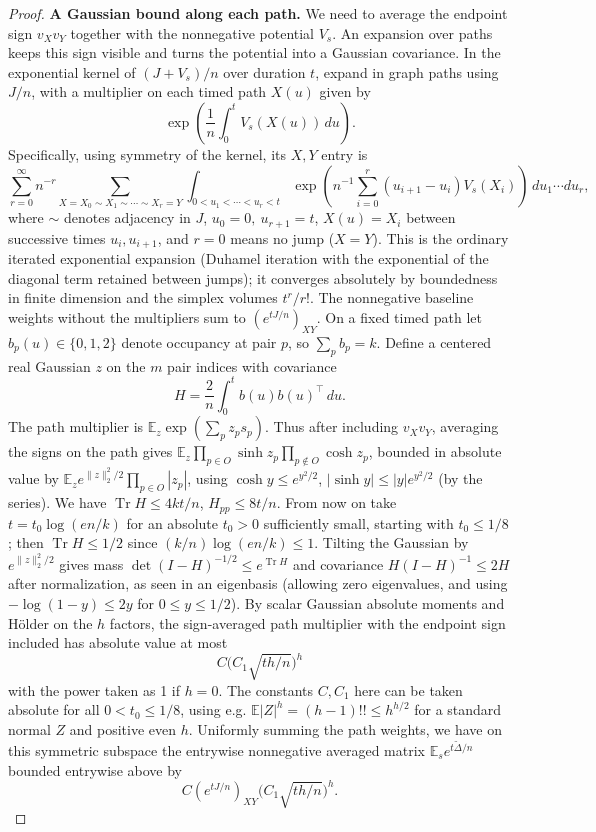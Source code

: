 \begin{proof}
\medskip\noindent\textbf{A Gaussian bound along each path.}\enspace
We need to average the endpoint sign $v_Xv_Y$ together with the
nonnegative potential $V_s$.  An expansion over paths keeps this sign
visible and turns the potential into a Gaussian covariance.
In the exponential kernel of \((J+V_s)/n\) over duration \(t\), expand in graph paths using \(J/n\), with a multiplier on each timed path \(X(u)\) given by
\[
\exp\left(\frac1n\int_0^t V_s(X(u))\,du\right).
\]
Specifically, using symmetry of the kernel, its \(X,Y\) entry is
\[
\sum_{r=0}^\infty n^{-r}
\sum_{X=X_0\sim X_1\sim\cdots\sim X_r=Y}
\int_{0<u_1<\cdots<u_r<t}
\exp\left(n^{-1}\sum_{i=0}^r(u_{i+1}-u_i)V_s(X_i)\right)\,du_1\cdots du_r ,
\]
where \(\sim\) denotes adjacency in \(J\), \(u_0=0,\ u_{r+1}=t\), \(X(u)=X_i\) between successive times \(u_i,u_{i+1}\), and \(r=0\) means no jump (\(X=Y\)). This is the ordinary iterated exponential expansion (Duhamel iteration with the exponential of the diagonal term retained between jumps); it converges absolutely by boundedness in finite dimension and the simplex volumes \(t^r/r!\). The nonnegative baseline weights without the multipliers sum to \((e^{tJ/n})_{XY}\). On a fixed timed path let \(b_p(u)\in\{0,1,2\}\) denote occupancy at pair \(p\), so \(\sum_p b_p=k\). Define a centered real Gaussian \(z\) on the \(m\) pair indices with covariance
\[
H=\frac2n\int_0^t b(u)b(u)^\top\,du .
\]
The path multiplier is \(\mathbb E_z\exp(\sum_p z_p s_p)\). Thus after including \(v_Xv_Y\), averaging the signs on the path gives \(\mathbb E_z\prod_{p\in O}\sinh z_p\prod_{p\notin O}\cosh z_p\), bounded in absolute value by \(\mathbb E_z e^{\|z\|_2^2/2}\prod_{p\in O}|z_p|\), using \(\cosh y\le e^{y^2/2}\), \(|\sinh y|\le |y| e^{y^2/2}\) (by the series). We have \(\operatorname{Tr}H\le 4kt/n\), \(H_{pp}\le8t/n\). From now on take \(t=t_0\log(e n/k)\) for an absolute \(t_0>0\) sufficiently small, starting with \(t_0\le1/8\); then \(\operatorname{Tr}H\le1/2\) since \((k/n)\log(e n/k)\le1\). Tilting the Gaussian by \(e^{\|z\|_2^2/2}\) gives mass \(\det(I-H)^{-1/2}\le e^{\operatorname{Tr}H}\) and covariance \(H(I-H)^{-1}\le2H\) after normalization, as seen in an eigenbasis (allowing zero eigenvalues, and using \(-\log(1-y)\le2y\) for \(0\le y\le1/2\)). By scalar Gaussian absolute moments and Hölder on the \(h\) factors, the sign-averaged path multiplier with the endpoint sign included has absolute value at most
\[
C\big(C_1\sqrt{t h/n}\big)^h
\]
with the power taken as 1 if \(h=0\). The constants \(C,C_1\) here can be taken absolute for all \(0<t_0\le1/8\), using e.g. \(\mathbb E|Z|^h=(h-1)!!\le h^{h/2}\) for a standard normal \(Z\) and positive even \(h\). Uniformly summing the path weights, we have on this symmetric subspace the entrywise nonnegative averaged matrix \(\mathbb E_s e^{t\widetilde\Delta/n}\) bounded entrywise above by
\begin{equation}
C(e^{tJ/n})_{XY} \big(C_1\sqrt{t h/n}\big)^h.
\label{cas:e13}
\end{equation}


\end{proof}
